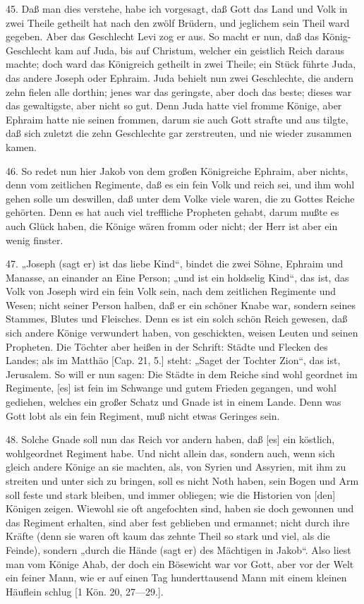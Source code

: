 45. Daß man dies verstehe, habe ich vorgesagt, daß Gott das Land und Volk in zwei Theile getheilt hat nach den zwölf Brüdern, und jeglichem sein Theil ward gegeben. Aber das Geschlecht Levi zog er aus. So macht er nun, daß das König-Geschlecht kam auf Juda, bis auf Christum, welcher ein geistlich Reich daraus machte; doch ward das Königreich getheilt in zwei Theile; ein Stück führte Juda, das andere Joseph oder Ephraim. Juda behielt nun zwei Geschlechte, die andern zehn fielen alle dorthin; jenes war das geringste, aber doch das beste; dieses war das gewaltigste, aber nicht so gut. Denn Juda hatte viel fromme Könige, aber Ephraim hatte nie seinen frommen, darum sie auch Gott strafte und aus tilgte, daß sich zuletzt die zehn Geschlechte gar zerstreuten, und nie wieder zusammen kamen.

46. So redet nun hier Jakob von dem großen Königreiche Ephraim, aber nichts, denn vom zeitlichen Regimente, daß es ein fein Volk und reich sei, und ihm wohl gehen solle um deswillen, daß unter dem Volke viele waren, die zu Gottes Reiche gehörten. Denn es hat auch viel treffliche Propheten gehabt, darum mußte es auch Glück haben, die Könige wären fromm oder nicht; der Herr ist aber ein wenig finster.

47. „Joseph (sagt er) ist das liebe Kind“, bindet die zwei Söhne, Ephraim und Manasse, an einander an Eine Person; „und ist ein holdselig Kind“, das ist, das Volk von Joseph wird ein fein Volk sein, nach dem zeitlichen Regimente und Wesen; nicht seiner Person halben, daß er ein schöner Knabe war, sondern seines Stammes, Blutes und Fleisches. Denn es ist ein solch schön Reich gewesen, daß sich andere Könige verwundert haben, von geschickten, weisen Leuten und seinen Propheten. Die Töchter aber heißen in der Schrift: Städte und Flecken des Landes; als im Matthäo [Cap. 21, 5.] steht: „Saget der Tochter Zion“, das ist, Jerusalem. So will er nun sagen: Die Städte in dem Reiche sind wohl geordnet im Regimente, [es] ist fein im Schwange und gutem Frieden gegangen, und wohl gediehen, welches ein großer Schatz und Gnade ist in einem Lande. Denn was Gott lobt als ein fein Regiment, muß nicht etwas Geringes sein.

48. Solche Gnade soll nun das Reich vor andern haben, daß [es] ein köstlich, wohlgeordnet Regiment habe. Und nicht allein das, sondern auch, wenn sich gleich andere Könige an sie machten, als, von Syrien und Assyrien, mit ihm zu streiten und unter sich zu bringen, soll es nicht Noth haben, sein Bogen und Arm soll feste und stark bleiben, und immer obliegen; wie die Historien von [den] Königen zeigen. Wiewohl sie oft angefochten sind, haben sie doch gewonnen und das Regiment erhalten, sind aber fest geblieben und ermannet; nicht durch ihre Kräfte (denn sie waren oft kaum das zehnte Theil so stark und viel, als die Feinde), sondern „durch die Hände (sagt er) des Mächtigen in Jakob“. Also liest man vom Könige Ahab, der doch ein Bösewicht war vor Gott, aber vor der Welt ein feiner Mann, wie er auf einen Tag hunderttausend Mann mit einem kleinen Häuflein schlug [1 Kön. 20, 27—29.].

